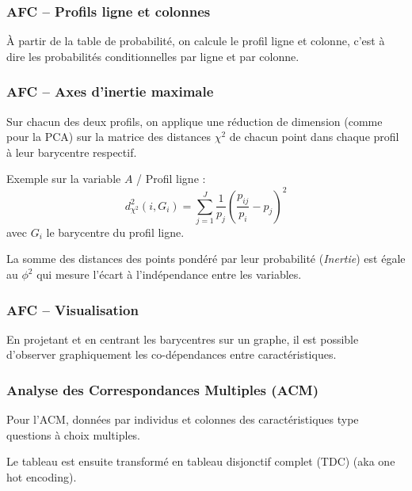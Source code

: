 \begin{frame}
  \frametitle{AFC -- Profils ligne et colonnes}
  \begin{minipage}{0.45\linewidth}
  \end{minipage}
  \hfill
  \begin{minipage}{0.45\linewidth}
  \end{minipage}

  À partir de la table de probabilité, on calcule le profil ligne et colonne, c'est à dire les probabilités conditionnelles par ligne et par colonne.
\end{frame}

\begin{frame}
  \frametitle{AFC -- Axes d'inertie maximale}
  Sur chacun des deux profils, on applique une réduction de dimension (comme pour la PCA) sur la matrice des distances $\chi^2$ de chacun point dans chaque profil à leur barycentre respectif.

  Exemple sur la variable $A$ / Profil ligne :
  \begin{equation*}
    d_{\chi^2}^2(i,G_i) = \sum^J_{j=1}\frac{1}{p_j}\left(\frac{p_{ij}}{p_i} - p_j \right)^2 
  \end{equation*}
  avec $G_i$ le barycentre du profil ligne.

  La somme des distances des points pondéré par leur probabilité (\emph{Inertie}) est égale au $\phi^2$ qui mesure l'écart à l'indépendance entre les variables.
\end{frame}

\begin{frame}
  \frametitle{AFC -- Visualisation}
  \begin{minipage}{0.59\linewidth}
  \end{minipage}
  \begin{minipage}{0.4\linewidth}
    En projetant et en centrant les barycentres sur un graphe, il est possible d'observer graphiquement les co-dépendances entre caractéristiques.
  \end{minipage}
\end{frame}

\begin{frame}
  \frametitle{Analyse des Correspondances Multiples (ACM)}
  Pour l'ACM, données par individus et colonnes des caractéristiques type questions à choix multiples.
  \begin{center}
  \end{center}
  Le tableau est ensuite transformé en tableau disjonctif complet (TDC) (aka one hot encoding).
\end{frame}

